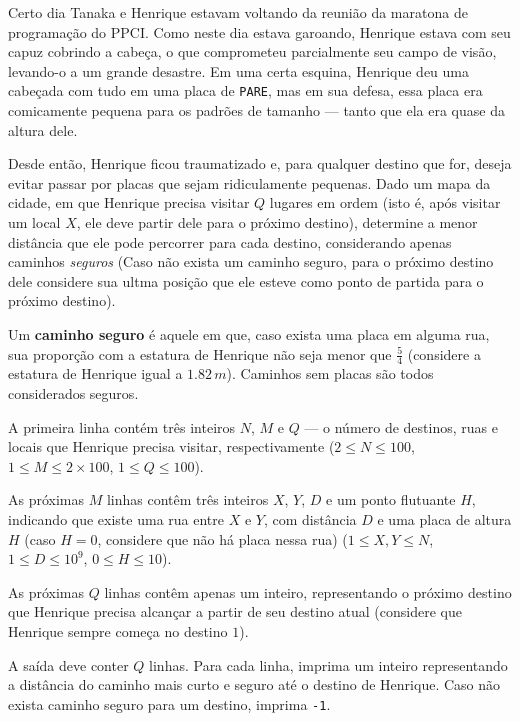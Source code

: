 Certo dia Tanaka e Henrique estavam voltando da reunião da maratona de programação do PPCI. Como neste dia estava garoando, Henrique estava com seu capuz cobrindo a cabeça, o que comprometeu parcialmente seu campo de visão, levando-o a um grande desastre.  
Em uma certa esquina, Henrique deu uma cabeçada com tudo em uma placa de \texttt{PARE}, mas em sua defesa, essa placa era comicamente pequena para os padrões de tamanho — tanto que ela era quase da altura dele.  

Desde então, Henrique ficou traumatizado e, para qualquer destino que for, deseja evitar passar por placas que sejam ridiculamente pequenas.  
Dado um mapa da cidade, em que Henrique precisa visitar $Q$ lugares em ordem (isto é, após visitar um local $X$, ele deve partir dele para o próximo destino), determine a menor distância que ele pode percorrer para cada destino, considerando apenas caminhos \textit{seguros} (Caso não exista um caminho seguro, para o próximo destino dele considere sua ultma posição que ele esteve como ponto de partida para o próximo destino).  

Um \textbf{caminho seguro} é aquele em que, caso exista uma placa em alguma rua, sua proporção com a estatura de Henrique não seja menor que $\frac{5}{4}$ (considere a estatura de Henrique igual a $1.82\,m$). Caminhos sem placas são todos considerados seguros.

A primeira linha contém três inteiros $N$, $M$ e $Q$ — o número de destinos, ruas e locais que Henrique precisa visitar, respectivamente  
($2 \leq N \leq 100$, $1 \leq M \leq 2 \times 100$, $1 \leq Q \leq 100$).  

As próximas $M$ linhas contêm três inteiros $X$, $Y$, $D$ e um ponto flutuante $H$, indicando que existe uma rua entre $X$ e $Y$, com distância $D$ e uma placa de altura $H$ (caso $H = 0$, considere que não há placa nessa rua)  
($1 \leq X, Y \leq N$, $1 \leq D \leq 10^9$, $0 \leq H \leq 10$).  

As próximas $Q$ linhas contêm apenas um inteiro, representando o próximo destino que Henrique precisa alcançar a partir de seu destino atual (considere que Henrique sempre começa no destino $1$).


A saída deve conter $Q$ linhas.  
Para cada linha, imprima um inteiro representando a distância do caminho mais curto e seguro até o destino de Henrique.  
Caso não exista caminho seguro para um destino, imprima \texttt{-1}.

